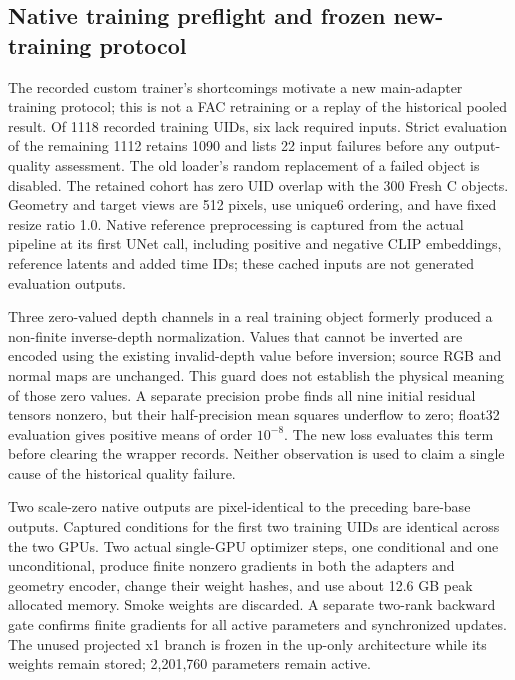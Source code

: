 \documentclass[11pt]{article}
\begin{document}
\subsection*{Native training preflight and frozen new-training protocol}
The recorded custom trainer's shortcomings motivate a new main-adapter training protocol; this is not a FAC retraining or a replay of the historical pooled result. Of 1118 recorded training UIDs, six lack required inputs. Strict evaluation of the remaining 1112 retains 1090 and lists 22 input failures before any output-quality assessment. The old loader's random replacement of a failed object is disabled. The retained cohort has zero UID overlap with the 300 Fresh C objects. Geometry and target views are 512 pixels, use unique6 ordering, and have fixed resize ratio 1.0. Native reference preprocessing is captured from the actual pipeline at its first UNet call, including positive and negative CLIP embeddings, reference latents and added time IDs; these cached inputs are not generated evaluation outputs.

Three zero-valued depth channels in a real training object formerly produced a non-finite inverse-depth normalization. Values that cannot be inverted are encoded using the existing invalid-depth value before inversion; source RGB and normal maps are unchanged. This guard does not establish the physical meaning of those zero values. A separate precision probe finds all nine initial residual tensors nonzero, but their half-precision mean squares underflow to zero; float32 evaluation gives positive means of order $10^{-8}$. The new loss evaluates this term before clearing the wrapper records. Neither observation is used to claim a single cause of the historical quality failure.

Two scale-zero native outputs are pixel-identical to the preceding bare-base outputs. Captured conditions for the first two training UIDs are identical across the two GPUs. Two actual single-GPU optimizer steps, one conditional and one unconditional, produce finite nonzero gradients in both the adapters and geometry encoder, change their weight hashes, and use about 12.6 GB peak allocated memory. Smoke weights are discarded. A separate two-rank backward gate confirms finite gradients for all active parameters and synchronized updates. The unused projected x1 branch is frozen in the up-only architecture while its weights remain stored; 2,201,760 parameters remain active.
\end{document}
